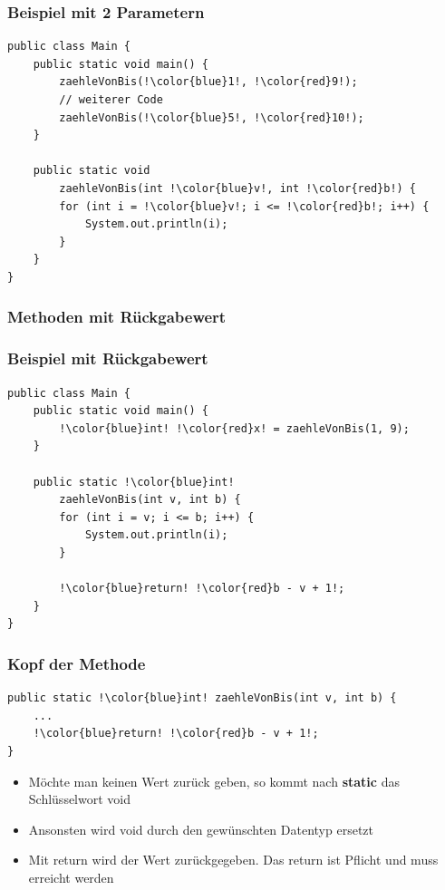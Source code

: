 \documentclass[final]{beamer}
\begin{document}
\begin{frame}[containsverbatim]
	\frametitle{Beispiel mit 2 Parametern}
	\begin{lstlisting}[escapechar=!]
public class Main {
	public static void main() {
		zaehleVonBis(!\color{blue}1!, !\color{red}9!);
		// weiterer Code
		zaehleVonBis(!\color{blue}5!, !\color{red}10!);
	}
	
	public static void 
		zaehleVonBis(int !\color{blue}v!, int !\color{red}b!) {
		for (int i = !\color{blue}v!; i <= !\color{red}b!; i++) {
			System.out.println(i);
		}
	}
}
	\end{lstlisting}
\end{frame}

\subsubsection{Methoden mit Rückgabewert}
\begin{frame}[containsverbatim]
	\frametitle{Beispiel mit Rückgabewert}
	\begin{lstlisting}[escapechar=!]
public class Main {
	public static void main() {
		!\color{blue}int! !\color{red}x! = zaehleVonBis(1, 9);
	}
	
	public static !\color{blue}int! 
		zaehleVonBis(int v, int b) {
		for (int i = v; i <= b; i++) {
			System.out.println(i);
		}
		
		!\color{blue}return! !\color{red}b - v + 1!;
	}
}
	\end{lstlisting}
\end{frame}

\begin{frame}[containsverbatim]
	\frametitle{Kopf der Methode}
	\begin{lstlisting}[escapechar=!]
public static !\color{blue}int! zaehleVonBis(int v, int b) {
	...
	!\color{blue}return! !\color{red}b - v + 1!;
}
	\end{lstlisting}
	\begin{itemize}
		\item{Möchte man keinen Wert zurück geben, so kommt nach \textbf{static} das Schlüsselwort \color{blue}void}
		\item{Ansonsten wird {\color{blue}void} durch den gewünschten Datentyp ersetzt}
		\item{Mit {\color{blue}return} wird der Wert zurückgegeben. Das {\color{blue}return} ist Pflicht und muss erreicht werden}
	\end{itemize}
\end{frame}
\end{document}
